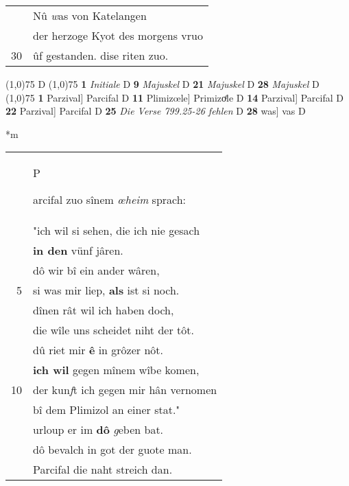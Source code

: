 \documentclass[8pt,a4paper,notitlepage]{article}
\begin{document}
\begin{table}[ht]
\begin{minipage}[t]{0.5\linewidth}
\begin{tabular}{rl}
 & Nû \textit{w}as von Katelangen\\ 
 & der herzoge Kyot des morgens vruo\\ 
30 & ûf gestanden. dise riten zuo.\\ 
\end{tabular}
\scriptsize
\line(1,0){75} \newline
D \newline
\line(1,0){75} \newline
\textbf{1} \textit{Initiale} D  \textbf{9} \textit{Majuskel} D  \textbf{21} \textit{Majuskel} D  \textbf{28} \textit{Majuskel} D  \newline
\line(1,0){75} \newline
\textbf{1} Parzival] Parcifal D \textbf{11} Plimizœle] Primizoͤle D \textbf{14} Parzival] Parcifal D \textbf{22} Parzival] Parcifal D \textbf{25} \textit{Die Verse 799.25-26 fehlen} D  \textbf{28} was] vas D \newline
\end{minipage}
\hspace{0.5cm}
\begin{minipage}[t]{0.5\linewidth}
\small
\begin{center}*m
\end{center}
\begin{tabular}{rl}
 & \begin{large}P\end{large}arcifal zuo sînem \textit{œheim} sprach:\\ 
 & "ich wil si sehen, die ich nie gesach\\ 
 & \textbf{in den} vünf jâren.\\ 
 & dô wir bî ein ander wâren,\\ 
5 & si was mir liep, \textbf{als} ist si noch.\\ 
 & dînen rât wil ich haben doch,\\ 
 & die wîle uns scheidet niht der tôt.\\ 
 & dû riet mir \textbf{ê} in grôzer nôt.\\ 
 & \textbf{ich wil} gegen mînem wîbe komen,\\ 
10 & der kun\textit{f}t ich gegen mir hân vernomen\\ 
 & bî dem Plimizol an einer stat."\\ 
 & urloup er im \textbf{dô} \textit{g}eben bat.\\ 
 & dô bevalch in got der guote man.\\ 
 & Parcifal die naht streich dan.\\ 

\end{tabular}
\end{minipage}
\end{table}
\end{document}
